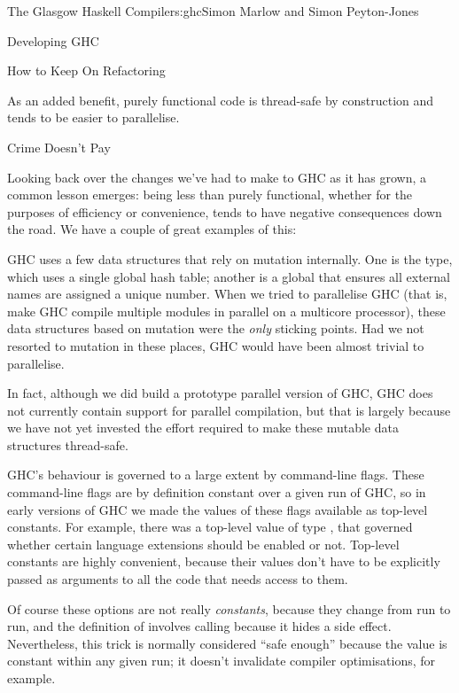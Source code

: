 \begin{aosachapter}{The Glasgow Haskell Compiler}{s:ghc}{Simon Marlow and Simon Peyton-Jones}
\begin{aosasect1}{Developing GHC}
\begin{aosasect2}{How to Keep On Refactoring}
\begin{aosaitemize}
  As an added benefit, purely functional code is thread-safe by
  construction and tends to be easier to parallelise.

\end{aosaitemize}

\end{aosasect2}

\begin{aosasect2}{Crime Doesn't Pay}

Looking back over the changes we've had to make to GHC as it has
grown, a common lesson emerges: being less than purely functional,
whether for the purposes of efficiency or convenience, tends to have
negative consequences down the road.  We have a couple of great
examples of this:

\begin{aosaitemize}

\item GHC uses a few data structures that rely on mutation internally.
  One is the  type, which uses a single global hash
  table; another is a global  that ensures all
  external names are assigned a unique number.  When we tried to
  parallelise GHC (that is, make GHC compile multiple modules in
  parallel on a multicore processor), these data structures based on
  mutation were the \emph{only} sticking points.  Had we not resorted
  to mutation in these places, GHC would have been almost trivial to
  parallelise.

  In fact, although we did build a prototype parallel version of GHC,
  GHC does not currently contain support for parallel compilation, but
  that is largely because we have not yet invested the effort required
  to make these mutable data structures thread-safe.

\item GHC's behaviour is governed to a large extent by command-line
  flags.  These command-line flags are by definition constant over a
  given run of GHC, so in early versions of GHC we made the values of
  these flags available as top-level constants. For example, there was
  a top-level value  of type , that
  governed whether certain language extensions should be enabled or
  not.  Top-level constants are highly convenient, because their
  values don't have to be explicitly passed as arguments to all the
  code that needs access to them.

  Of course these options are not really \emph{constants}, because
  they change from run to run, and the definition of
   involves calling 
  because it hides a side effect.  Nevertheless, this trick is
  normally considered ``safe enough'' because the value is constant
  within any given run; it doesn't invalidate compiler optimisations,
  for example.


\end{aosaitemize}
\end{aosasect2}
\end{aosasect1}
\end{aosachapter}
